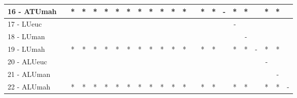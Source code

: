 \begin{table}[h]
\begin{center}
\begin{tabular}{lcc|cc|cc|cc|cc|cc|cc|cc|cc|cc|cc}
16 - ATUmah	&   & * & * & * & * & * & * & * & * & * & * & * &   & * & * & - & * & * &   & * & * &   \\ \hline
17 - LUeuc	&   &   &   &   &   &   &   &   &   &   &   &   &   &   &   &   & - &   &   &   &   &   \\
18 - LUman	&   &   &   &   &   &   &   &   &   &   &   &   &   &   &   &   &   & - &   &   &   &   \\ \hline
19 - LUmah	&   & * & * & * & * & * & * & * & * & * & * & * &   & * & * &   & * & * & - & * & * &   \\
20 - ALUeuc	&   &   &   &   &   &   &   &   &   &   &   &   &   &   &   &   &   &   &   & - &   &   \\ \hline
21 - ALUman	&   &   &   &   &   &   &   &   &   &   &   &   &   &   &   &   &   &   &   &   & - &   \\
22 - ALUmah	&   & * & * & * & * & * & * & * & * & * & * & * &   & * & * &   & * & * &   & * & * & - \\ \hline\end{tabular}
\label{stratsBalAccFried}
\end{center}
\end{table}